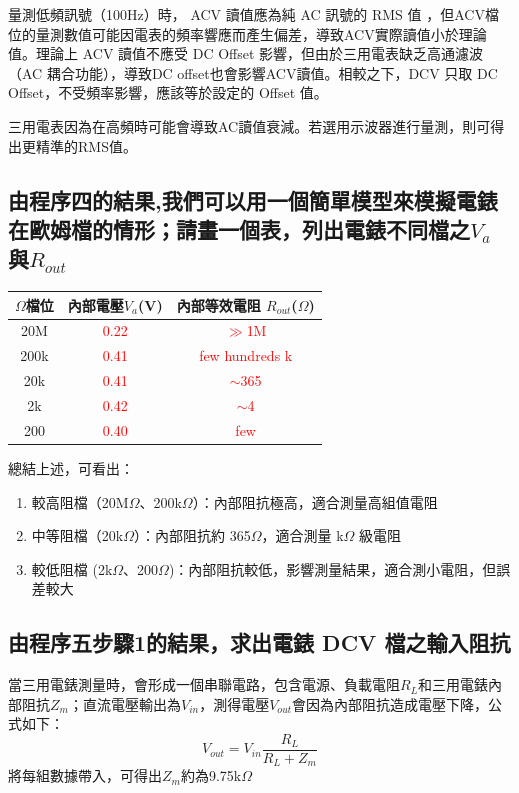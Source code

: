 \documentclass[12pt,a4paper]{article}
\begin{document}
\begin{CJK}{UTF8}{bkai}
量測低頻訊號（100Hz）時， ACV 讀值應為純 AC 訊號的 RMS 值 ，但ACV檔位的量測數值可能因電表的頻率響應而產生偏差，導致ACV實際讀值小於理論值。理論上 ACV 讀值不應受 DC Offset 影響，但由於三用電表缺乏高通濾波（AC 耦合功能），導致DC offset也會影響ACV讀值。相較之下，DCV 只取 DC Offset，不受頻率影響，應該等於設定的 Offset 值。

三用電表因為在高頻時可能會導致AC讀值衰減。若選用示波器進行量測，則可得出更精準的RMS值。

\subsection{由程序四的結果,我們可以用一個簡單模型來模擬電錶在歐姆檔的情形；請畫一個表，列出電錶不同檔之$V_{a}$與$R_{out}$}\label{subsec:4}
\hfill

\begin{center}
        \begin{tabular}{c|c|c}
        $\Omega$檔位  &  內部電壓$V_{a}$(V)   &   內部等效電阻
        $R_{out}$($\Omega$)\\
        \hline
        \hline
        20M &   \textcolor{red}{0.22}    &   \textcolor{red}{$\gg$1M}\\\hline
        200k    &   \textcolor{red}{0.41}    &   \textcolor{red}{few hundreds k}\\\hline
        20k    &   \textcolor{red}{0.41}    &   \textcolor{red}{$\sim$365}\\\hline
        2k    &   \textcolor{red}{0.42}    &   \textcolor{red}{$\sim$4}\\\hline
        200    &   \textcolor{red}{0.40}    &   \textcolor{red}{few}\\\hline
        \end{tabular}
    \end{center}
    總結上述，可看出：
    \begin{enumerate}
        \item 較高阻檔（20M$\Omega$、200k$\Omega$）：內部阻抗極高，適合測量高組值電阻
        \item 中等阻檔（20k$\Omega$）：內部阻抗約 365$\Omega$，適合測量 k$\Omega$ 級電阻
        \item 較低阻檔 (2k$\Omega$、200$\Omega$)：內部阻抗較低，影響測量結果，適合測小電阻，但誤差較大
    \end{enumerate}

\subsection{由程序五步驟1的結果，求出電錶 DCV 檔之輸入阻抗}\label{subsec:5}
\hfill

當三用電錶測量時，會形成一個串聯電路，包含電源、負載電阻$R_{L}$和三用電錶內部阻抗$Z_{m}$；直流電壓輸出為$V_{in}$，測得電壓$V_{out}$會因為內部阻抗造成電壓下降，公式如下：
\begin{equation}
    V_{out} = V_{in} \frac{R_{L}}{R_{L}+Z_{m}}
\end{equation}
將每組數據帶入，可得出$Z_{m}$約為9.75k$\Omega$




\end{CJK}
\end{document}
